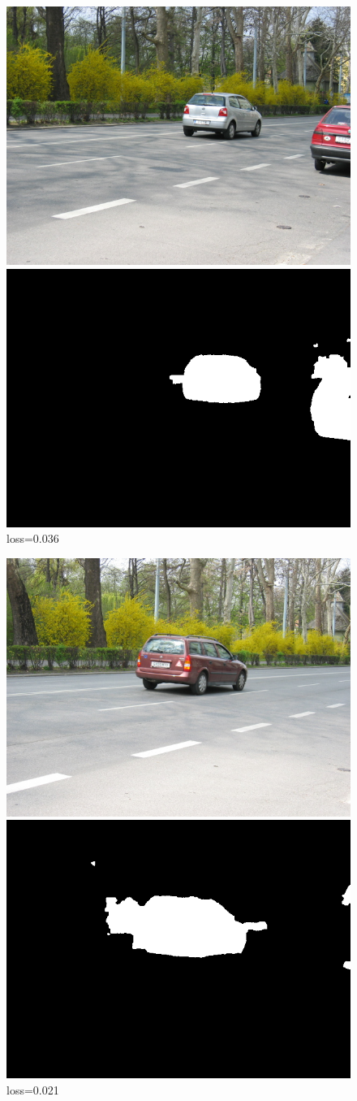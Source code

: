 \documentclass[russian,10pt,a4paper]{article}
\theoremstyle{definition}
\begin{document}
\begin{figure}[!h]
  \center
    \includegraphics[width=0.45\linewidth]{images/imgTrain_110}$ $
    \includegraphics[width=0.45\linewidth]{images/110_segm_res}
loss=0.036
 
 \hfill

  \center
    \includegraphics[width=0.45\linewidth]{images/imgTrain_111}$ $
    \includegraphics[width=0.45\linewidth]{images/111_segm_res}
loss=0.021
\end{figure}
\end{document}
